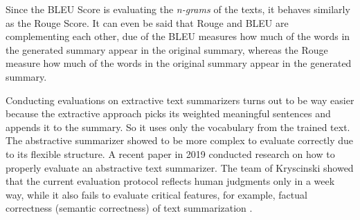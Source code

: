 Since the BLEU Score is evaluating the \textit{n-grams} of the texts, it behaves similarly as the Rouge Score. It can even be said that Rouge and BLEU are complementing each other, due of the BLEU measures how much of the words in the generated summary appear in the original summary, whereas the Rouge measure how much of the words in the original summary appear in the generated summary.

Conducting evaluations on extractive text summarizers turns out to be way easier because the extractive approach picks its weighted meaningful sentences and appends it to the summary. So it uses only the vocabulary from the trained text. The abstractive summarizer showed to be more complex to evaluate correctly due to its flexible structure.
A recent paper in 2019 conducted research on how to properly evaluate an abstractive text summarizer. The team of Kryscinski showed that the current evaluation protocol reflects human judgments only in a week way, while it also fails to evaluate critical features, for example, factual correctness (semantic correctness) of text summarization \cite{kryscinski-etal-2019-neural}.